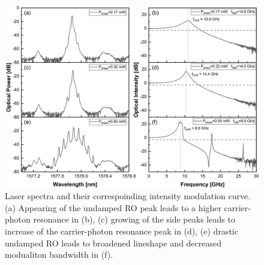 \begin{figure}[ht]
    \centering
    \includegraphics[width=\linewidth]{figures/Undamped_RO_and_bandwidth_grating_4621.png}
    \caption{Laser spectra and their correspoinding intensity modulation curve. (a) Appearing of the undamped RO peak leads to a higher carrier-photon resonance in (b), (c) growing of the side peaks leads to increase of the carrier-photon resonance peak in (d), (e) drastic undamped RO leads to broadened lineshape and decreased modualiton bandwidth in (f).}
    \label{fig:undamped_RO}
\end{figure}



